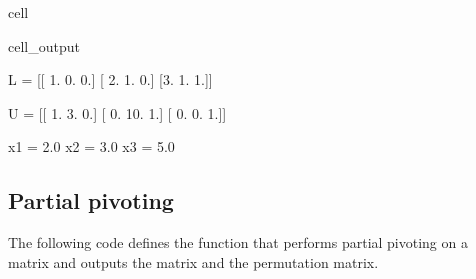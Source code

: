 \documentclass[letterpaper,10pt,english]{jupyterBook}
\begin{document}
\begin{sphinxuseclass}{cell}
\begin{sphinxVerbatimOutput}
\begin{sphinxuseclass}{cell_output}
\begin{sphinxVerbatim}[commandchars=\\\{\}]
L = 
[[ 1.  0.  0.]
 [ 2.  1.  0.]
 [\PYGZhy{}3. \PYGZhy{}1.  1.]]

U = 
[[  1.   3.   0.]
 [  0. \PYGZhy{}10.  \PYGZhy{}1.]
 [  0.   0.   1.]]

x1 = 2.0
x2 = \PYGZhy{}3.0
x3 = 5.0
\end{sphinxVerbatim}

\end{sphinxuseclass}\end{sphinxVerbatimOutput}

\end{sphinxuseclass}

\subsection{Partial pivoting}
\label{\detokenize{8_Appendices/8.1_Python:partial-pivoting}}
\sphinxAtStartPar
The following code defines the function  that performs partial pivoting on a matrix and outputs the matrix and the permutation matrix.
\end{document}

